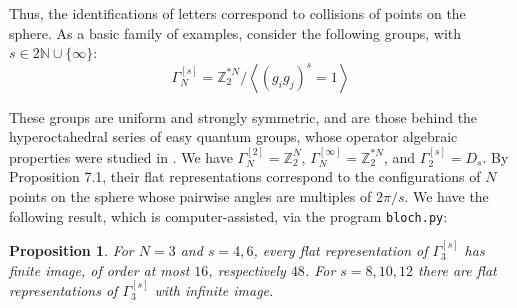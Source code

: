 \documentclass[12pt]{amsart}
\newtheorem{proposition}[theorem]{Proposition}
\theoremstyle{definition}
\begin{document}
Thus, the identifications of letters correspond to collisions of points on the sphere. As a basic family of examples, consider the following groups, with $s\in2\mathbb N\cup\{\infty\}$:
$$\Gamma_N^{[s]}=\mathbb Z_2^{*N}\Big/\left\langle(g_ig_j)^s=1\right\rangle$$

These groups are uniform and strongly symmetric, and are those behind the hyperoctahedral series of easy quantum groups, whose operator algebraic properties were studied in \cite{rw2}. We have $\Gamma_N^{[2]}=\mathbb Z_2^N$, $\Gamma_N^{[\infty]}=\mathbb Z_2^{*N}$, and $\Gamma_2^{[s]}=D_s$. By Proposition 7.1, their flat representations correspond to the configurations of $N$ points on the sphere whose pairwise angles are multiples of $2\pi/s$. We have the following result, which is computer-assisted, via the program {\tt bloch.py}:

\begin{proposition}
For $N=3$ and $s=4,6$, every flat representation of $\Gamma_3^{[s]}$ has finite image, of order at most $16$, respectively $48$. For $s=8,10,12$ there are flat representations of $\Gamma_3^{[s]}$ with infinite image.
\end{proposition}
\end{document}
